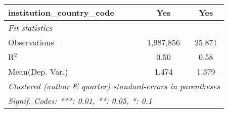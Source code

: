 \begin{tabular}{lcc}
   institution\_country\_code                                 & Yes            & Yes\\  
   \midrule
   \emph{Fit statistics}\\
   Observations                                               & 1,987,856      & 25,871\\  
   R$^2$                                                      & 0.50           & 0.58\\  
Mean(Dep. Var.) & 1.474 & 1.379 \\
   \midrule \midrule
   \multicolumn{3}{l}{\emph{Clustered (author \& quarter) standard-errors in parentheses}}\\
   \multicolumn{3}{l}{\emph{Signif. Codes: ***: 0.01, **: 0.05, *: 0.1}}\\
\end{tabular}
\par\endgroup
